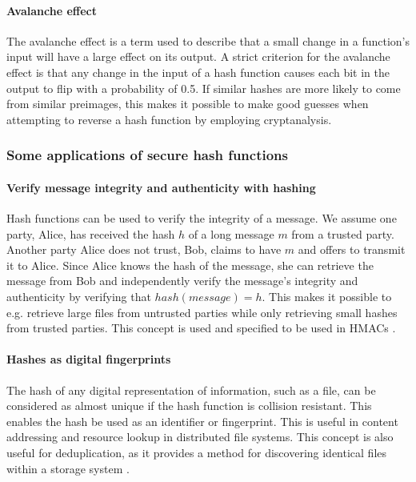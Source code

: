 \paragraph{Avalanche effect}
The avalanche effect is a term used to describe that a small change in a function's input will have a large effect on its output. A strict criterion for the avalanche effect is that any change in the input of a hash function causes each bit in the output to flip with a probability of 0.5. If similar hashes are more likely to come from similar preimages, this makes it possible to make good guesses when attempting to reverse a hash function by employing cryptanalysis.

\subsubsection{Some applications of secure hash functions}

\paragraph{Verify message integrity and authenticity with hashing}
Hash functions can be used to verify the integrity of a message. We assume one party, Alice, has received the hash $h$ of a long message $m$ from a trusted party. Another party Alice does not trust, Bob, claims to have $m$ and offers to transmit it to Alice. Since Alice knows the hash of the message, she can retrieve the message from Bob and independently verify the message's integrity and authenticity by verifying that $hash(message) = h$. This makes it possible to e.g. retrieve large files from untrusted parties while only retrieving small hashes from trusted parties. This concept is used and specified to be used in HMACs \cite[p.~158--164]{lindell2014introduction}.

\paragraph{Hashes as digital fingerprints}
The hash of any digital representation of information, such as a file, can be considered as almost unique if the hash function is collision resistant. This enables the hash be used as an identifier or fingerprint. This is useful in content addressing and resource lookup in distributed file systems. This concept is also useful for deduplication, as it provides a method for discovering identical files within a storage system \cite[p.~182-183]{lindell2014introduction}. 

